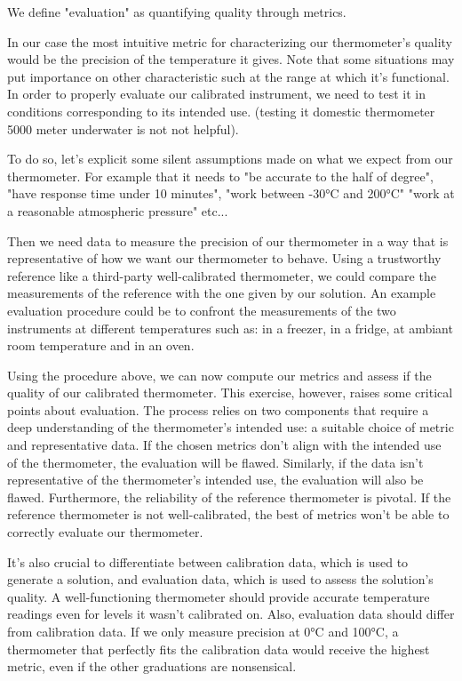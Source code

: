 \begin{bibunit}
We define "evaluation" as quantifying quality through metrics.

In our case the most intuitive metric for characterizing our thermometer's quality would be the precision of the temperature it gives.
Note that some situations may put importance on other characteristic such at the range at which it's functional.
  In order to properly evaluate our calibrated instrument, we need to test it in conditions corresponding to its intended use. (testing it domestic thermometer 5000 meter underwater is not not helpful).

 To do so, let's explicit some silent assumptions made on what we expect from our thermometer.
  For example that it needs to "be accurate to the half of degree", "have response time under 10 minutes", "work between -30°C and 200°C" "work at a reasonable atmospheric pressure" etc...

Then we need data to measure the precision of our thermometer in a way that is representative of how we want our thermometer to behave. Using a trustworthy reference like a third-party well-calibrated thermometer, we could compare the measurements of the reference with the one given by our solution.
  An example evaluation procedure could be to confront the measurements of the two instruments at different temperatures such as: in a freezer, in a fridge, at ambiant room temperature and in an oven.

Using the procedure above, we can now compute our metrics and assess if the quality of our calibrated thermometer.
This exercise, however, raises some critical points about evaluation. The process relies on two components that require a deep understanding of the thermometer's intended use: a suitable choice of metric and representative data. If the chosen metrics don't align with the intended use of the thermometer, the evaluation will be flawed. Similarly, if the data isn't representative of the thermometer's intended use, the evaluation will also be flawed.
 Furthermore, the reliability of the reference thermometer is pivotal. If the reference thermometer is not well-calibrated, the best of metrics won't be able to correctly evaluate our thermometer. 

It's also crucial to differentiate between calibration data, which is used to generate a solution, and evaluation data, which is used to assess the solution's quality.
A well-functioning thermometer should provide accurate temperature readings even for levels it wasn't calibrated on. Also, evaluation data should differ from calibration data. If we only measure precision at 0°C and 100°C, a thermometer that perfectly fits the calibration data would receive the highest metric, even if the other graduations are nonsensical.



\end{bibunit}
